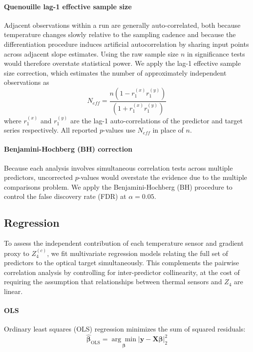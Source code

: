 \documentclass[SE,authoryear,toc]{lsstdoc}
\begin{document}
\paragraph{Quenouille lag-1 effective sample size}
Adjacent observations within a run are generally auto-correlated, both because temperature changes slowly relative to the sampling cadence and because the \cite{savitzky1964} differentiation procedure induces artificial autocorrelation by sharing input points across adjacent slope estimates. Using the raw sample size $n$ in significance tests would therefore overstate statistical power. We apply the \cite{quenouille1949} lag-1 effective sample size correction, which estimates the number of approximately independent observations as 
\begin{equation}
    N_{eff} = \frac{n(1-r_1^{(x)} r_1^{(y)})}{(1+r_1^{(x)} r_1^{(y)})}
\end{equation} where $r_1^{(x)}$ and $r_1^{(y)}$ are the lag-1 auto-correlations of the predictor and target series respectively. All reported $p$-values use $N_{eff}$ in place of $n$.

\paragraph{Benjamini-Hochberg (BH) correction}

Because each analysis involves simultaneous correlation tests across multiple predictors, uncorrected $p$-values would overstate the evidence due to the multiple comparisons problem. We apply the Benjamini-Hochberg (BH) procedure \citep{Benjamini1995} to control the false discovery rate (FDR) at $\alpha = 0.05$.


\subsection{Regression}
\label{sec: regression methods}

To assess the independent contribution of each temperature sensor and gradient proxy to $Z_4^{(c)}$, we fit multivariate regression models relating the full set of predictors to the optical target simultaneously. This complements the pairwise correlation analysis by controlling for inter-predictor collinearity, at the cost of requiring the assumption that relationships between thermal sensors and $Z_4$ are linear.

\paragraph{OLS}
Ordinary least squares (OLS) regression minimizes the sum of squared residuals:
\begin{equation}
\hat{\boldsymbol{\beta}}_\text{OLS} = \underset{\boldsymbol{\beta}}{\arg\min} \left| \mathbf{y} - \mathbf{X}\boldsymbol{\beta} \right|_2^2
\end{equation}
\end{document}
